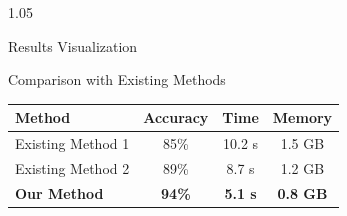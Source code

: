 \documentclass[final]{beamer}
\newlength{\colwidth}
\begin{document}
\begin{frame}[t]
\begin{columns}[t]
\begin{column}{1.05\colwidth}

\begin{block}{Results Visualization}

\begin{center}



\end{center}

\end{block}



\begin{block}{Comparison with Existing Methods}

\begin{table}

\centering

\begin{tabular}{lccc}

\toprule

Method
&
Accuracy
&
Time
&
Memory
\\

\midrule

Existing Method 1
&
85\%
&
10.2 s
&
1.5 GB
\\

Existing Method 2
&
89\%
&
8.7 s
&
1.2 GB
\\

\textbf{Our Method}
&
\textbf{94\%}
&
\textbf{5.1 s}
&
\textbf{0.8 GB}
\\

\bottomrule


\end{tabular}
\end{table}
\end{block}
\end{column}
\end{columns}
\end{frame}
\end{document}
